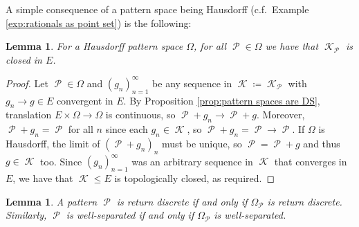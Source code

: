 \documentclass[11pt]{amsart}
\numberwithin{equation}{section}
\theoremstyle{plain}
\newtheorem{lemma}[theorem]{Lemma}
\theoremstyle{definition}
\DeclareMathOperator{\cP}{\mathcal{P}}
\DeclareMathOperator{\cK}{\mathcal{K}}
\begin{document}
A simple consequence of a pattern space being Hausdorff (c.f.\ Example \ref{exp:rationals as point set}) is the following:

\begin{lemma}\label{lem:HD=>periods closed}
For a Hausdorff pattern space \(\Omega\), for all \(\cP \in \Omega\) we have that \(\cK_{\cP}\) is closed in \(E\).
\end{lemma}

\begin{proof}
Let \(\cP \in \Omega\) and \((g_n)_{n=1}^\infty\) be any sequence in \(\cK \coloneqq \cK_{\cP}\) with \(g_n \to g \in E\) convergent in \(E\). By Proposition \ref{prop:pattern spaces are DS}, translation \(E \times \Omega \to \Omega\) is continuous, so \(\cP + g_n \to \cP + g\). Moreover, \(\cP + g_n = \cP\) for all \(n\) since each \(g_n \in \cK\), so \(\cP + g_n = \cP \to \cP\). If \(\Omega\) is Hausdorff, the limit of \((\cP + g_n)_n\) must be unique, so \(\cP = \cP + g\) and thus \(g \in \cK\) too. Since \((g_n)_{n=1}^\infty\) was an arbitrary sequence in \(\cK\) that converges in \(E\), we have that \(\cK \leqslant E\) is topologically closed, as required.
\end{proof}

\begin{lemma}\label{lem:separation for pattern spaces}
A pattern \(\cP\) is return discrete if and only if \(\Omega_{\cP}\) is return discrete. Similarly, \(\cP\) is well-separated if and only if \(\Omega_{\cP}\) is well-separated.
\end{lemma}
\end{document}
